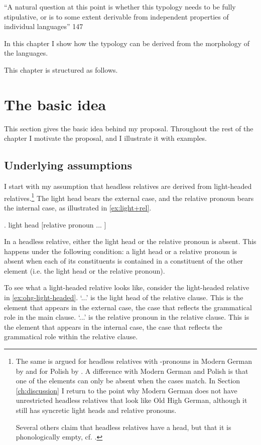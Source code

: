 ``A natural question at this point is whether this typology needs to be fully stipulative, or is to some extent derivable from independent properties of individual languages'' \citet{grosu1994}{147}

In this chapter I show how the typology can be derived from the morphology of the languages.

This chapter is structured as follows.


\section{The basic idea}\label{sec:basic-idea}

This section gives the basic idea behind my proposal. Throughout the rest of the chapter I motivate the proposal, and I illustrate it with examples.

\subsection{Underlying assumptions}

I start with my assumption that headless relatives are derived from light-headed relatives.\footnote{
The same is argued for headless relatives with -pronouns in Modern German by \citealt{fuss2014,hanink2018} and for Polish by \citealt{citko2004}.
A difference with Modern German and Polish is that one of the elements can only be absent when the cases match. In Section \ref{ch:discussion} I return to the point why Modern German does not have unrestricted headless relatives that look like Old High German, although it still has syncretic light heads and relative pronouns.

Several others claim that headless relatives have a head, but that it is phonologically empty, cf. \citealt{bresnan1978,groos1981,himmelreich2017}.
}
The light head bears the external case, and the relative pronoun bears the internal case, as illustrated in \ref{ex:light+rel}.

\ex. light head [relative pronoun ... ]\label{ex:light+rel}

In a headless relative, either the light head or the relative pronoun is absent.
This happens under the following condition: a light head or a relative pronoun is absent when each of its constituents is contained in a constituent of the other element (i.e. the light head or the relative pronoun).

To see what a light-headed relative looks like, consider the light-headed relative in \ref{ex:ohg-light-headed}.
 `...' is the light head of the relative clause. This is the element that appears in the external case, the case that reflects the grammatical role in the main clause.
 `...' is the relative pronoun in the relative clause. This is the element that appears in the internal case, the case that reflects the grammatical role within the relative clause.

